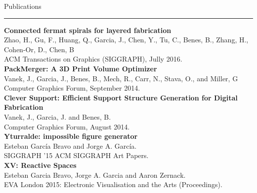 \documentclass[letterpaper,10pt]{article}
\begin{document}

\begin{minipage}{0.55\textwidth}
\vspace*{0.5cm}
 {\large{Publications}} \\
 \textcolor{Dandelion}{\rule{0.3\textwidth}{0.05in}} 

\textbf{Connected fermat spirals for layered fabrication} \\
Zhao, H., Gu, F., Huang, Q., Garcia, J., Chen, Y., Tu, C., Benes, B., Zhang, H., Cohen-Or, D., Chen, B\\
ACM Transactions on Graphics (SIGGRAPH), Jully 2016.\\

\textbf{PackMerger: A 3D Print Volume Optimizer} \\
Vanek, J., Garcia, J., Benes, B., Mech, R., Carr, N., Stava, O., and Miller, G\\
Computer Graphics Forum, September 2014.\\

\textbf{Clever Support: Efficient Support Structure Generation for Digital Fabrication} \\
Vanek, J., Garcia, J. and Benes, B.\\
Computer Graphics Forum, August 2014.\\

\textbf{Yturralde: impossible figure generator} \\
Esteban Garc\'{i}a Bravo and Jorge A. Garc\'{i}a.\\
SIGGRAPH '15 ACM SIGGRAPH Art Papers.\\

\textbf{XV: Reactive Spaces} \\
Esteban Garcia Bravo, Jorge A. Garcia and Aaron Zernack.\\
EVA London 2015: Electronic Visualisation and the Arts (Proceedings).\\



\end{minipage}
%
\hspace{0.05\textwidth}
%
\end{document}
